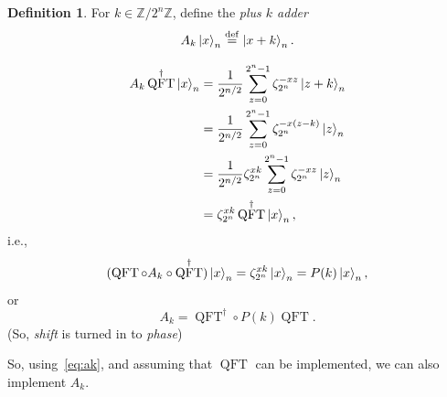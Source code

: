 \documentclass[12pt]{amsart}
\theoremstyle{plain}
\theoremstyle{definition}
\newtheorem{definition}[theorem]{Definition}
\theoremstyle{remark}
\newcommand{\Z}{\mathbb{Z}}
\newcommand{\idef}{\overset{{\rm def}}{=}}
\newcommand{\adj}[1]{#1^{\dagger}}  %
\DeclareMathOperator{\qft}{QFT}  %
\begin{document}
\begin{definition}
  For $k \in \Z/{2^n}\Z$, define the \emph{plus $k$ adder}
  \[
    A_k \ket{x}_n \idef \ket{x + k}_n.
  \]
\end{definition}


\begin{align*}
  A_k \adj{\qft} \ket{x}_n
  &= \frac{1}{2^{n/2}} \sum_{z=0}^{2^n - 1} \zeta_{2^n}^{-xz} \ket{z + k}_n \\
  &= \frac{1}{2^{n/2}} \sum_{z=0}^{2^n - 1} \zeta_{2^n}^{-x(z-k)} \ket{z}_n \\
  &= \frac{1}{2^{n/2}} \zeta_{2^n}^{xk }\sum_{z=0}^{2^n - 1} \zeta_{2^n}^{-xz} \ket{z}_n \\
  &= \zeta_{2^n}^{xk} \adj{\qft} \ket{x}_n,
\end{align*}
i.e.,
\begin{equation}
  \label{eq:qftak}
  (\qft \circ A_k \circ \adj{\qft}) \ket{x}_n = \zeta_{2^n}^{xk} \ket{x}_n = P(k) \ket{x}_n,
\end{equation}
or
\begin{equation}\label{eq:ak}
  A_k = \adj{\qft} \circ P(k) \qft.
\end{equation}
(So, \emph{shift} is turned in to \emph{phase})


So, using~\cref{eq:ak}, and assuming that $\qft$ can be implemented, we can also implement $A_k$.
\end{document}
